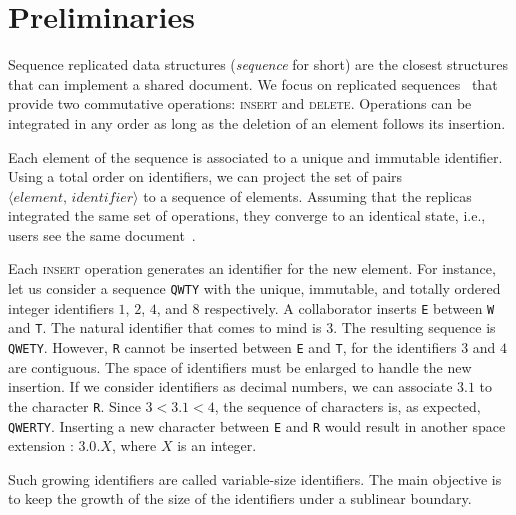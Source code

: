
\section{Preliminaries}
\label{sec:preliminaries}

Sequence replicated data structures (\emph{sequence} for short) are the closest
structures that can implement a shared document.  We focus on replicated
sequences~\cite{shapiro2011comprehensive, shapiro2011conflict} that provide two
commutative operations: \textsc{insert} and \textsc{delete}. Operations can be
integrated in any order as long as the deletion of an element follows its
insertion.

\noindent Each element of the sequence is associated to a unique and immutable
identifier. Using a total order on identifiers, we can project the set of pairs
$\langle element,\, identifier \rangle$ to a sequence of elements. Assuming that
the replicas integrated the same set of operations, they converge to an
identical state, i.e., users see the same document~\cite{shapiro2011conflict}.

Each \textsc{insert} operation generates an identifier for the new element.  For
instance, let us consider a sequence \texttt{QWTY} with the unique, immutable,
and totally ordered integer identifiers $1$, $2$, $4$, and $8$ respectively. A
collaborator inserts \texttt{E} between \texttt{W} and \texttt{T}. The natural
identifier that comes to mind is $3$. The resulting sequence is
\texttt{QWETY}. However, \texttt{R} cannot be inserted between \texttt{E} and
\texttt{T}, for the identifiers $3$ and $4$ are contiguous. The space of
identifiers must be enlarged to handle the new insertion. If we consider
identifiers as decimal numbers, we can associate $3.1$ to the character
\texttt{R}. Since $3 < 3.1 < 4$, the sequence of characters is, as expected,
\texttt{QWERTY}. Inserting a new character between \texttt{E} and \texttt{R}
would result in another space extension : $3.0.X$, where $X$ is an integer.


Such growing identifiers are called variable-size identifiers. The main
objective is to keep the growth of the size of the identifiers under a sublinear
boundary.

